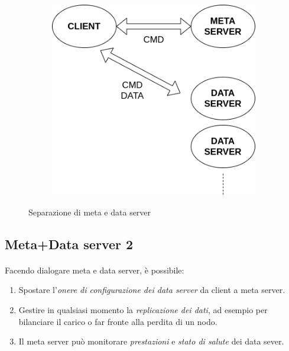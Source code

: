\documentclass[11pt,a4paper,english]{article}
\begin{document}
\begin{figure}[H]
	\centering
	\begin{subfigure}{0.60\linewidth}
		\includegraphics[width=\linewidth]{../diagrams/architettura/5.png}
	\end{subfigure}
	\caption{Separazione di meta e data server}
\end{figure}



\subsection{Meta+Data server 2}

\paragraph{} Facendo dialogare meta e data server, è possibile:\begin{enumerate}
	\item Spostare l'\emph{onere di configurazione dei data server} da client a meta server.
	\item Gestire in qualsiasi momento la \emph{replicazione dei dati}, ad esempio per bilanciare il carico o far fronte alla perdita di un nodo.
	\item Il meta server può monitorare \emph{prestazioni} e \emph{stato di salute} dei data sever.
\end{enumerate}
\end{document}
